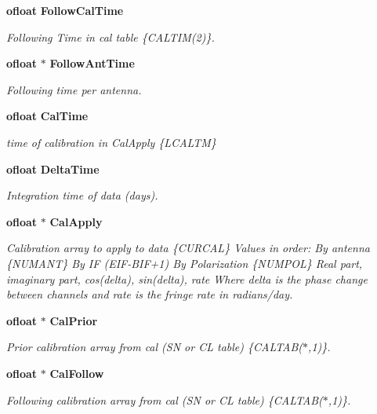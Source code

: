 \begin{CompactItemize}
{\bf ofloat} {\bf Follow\-Cal\-Time}
\begin{CompactList}\small\item\em Following Time in cal table \{CALTIM(2)\}. \item\end{CompactList}\item 
{\bf ofloat} $\ast$ {\bf Follow\-Ant\-Time}
\begin{CompactList}\small\item\em Following time per antenna. \item\end{CompactList}\item 
{\bf ofloat} {\bf Cal\-Time}
\begin{CompactList}\small\item\em time of calibration in Cal\-Apply \{LCALTM\} \item\end{CompactList}\item 
{\bf ofloat} {\bf Delta\-Time}
\begin{CompactList}\small\item\em Integration time of data (days). \item\end{CompactList}\item 
{\bf ofloat} $\ast$ {\bf Cal\-Apply}
\begin{CompactList}\small\item\em Calibration array to apply to data \{CURCAL\} Values in order: By antenna \{NUMANT\} By IF (EIF-BIF+1) By Polarization \{NUMPOL\} Real part, imaginary part, cos(delta), sin(delta), rate Where delta is the phase change between channels and rate is the fringe rate in radians/day. \item\end{CompactList}\item 
{\bf ofloat} $\ast$ {\bf Cal\-Prior}
\begin{CompactList}\small\item\em Prior calibration array from cal (SN or CL table) \{CALTAB($\ast$,1)\}. \item\end{CompactList}\item 
{\bf ofloat} $\ast$ {\bf Cal\-Follow}
\begin{CompactList}\small\item\em Following calibration array from cal (SN or CL table) \{CALTAB($\ast$,1)\}. \item\end{CompactList}\item 

\end{CompactItemize}
